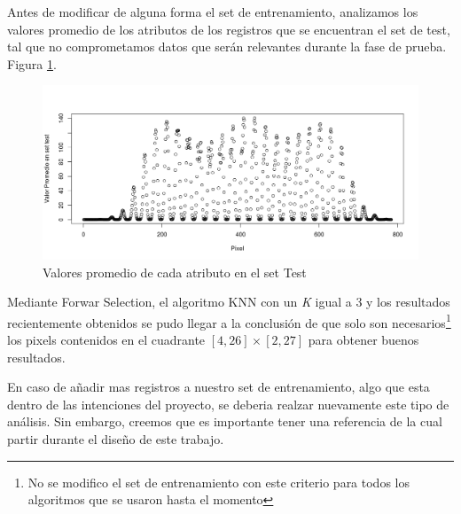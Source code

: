 Antes de modificar de alguna forma el set de entrenamiento, analizamos los valores promedio de los atributos de los registros que se encuentran el set de test, tal que no comprometamos datos que serán relevantes durante la fase de prueba. Figura \ref{plot2}.

\begin{figure}[htp]
  \begin{center}
    \includegraphics[width=15cm]{Rplot01.jpeg}
    \caption{Valores promedio de cada atributo en el set Test}
    \label{plot2}
  \end{center}
\end{figure}

Mediante Forwar Selection, el algoritmo KNN con un \textit{K} igual a 3 y los resultados recientemente obtenidos se pudo llegar a la conclusión de que solo son necesarios\footnote{No se modifico el set de entrenamiento con este criterio para todos los algoritmos que se usaron hasta el momento} los pixels contenidos en el cuadrante $ [4,26]\times[2,27] $ para obtener buenos resultados. 

En caso de añadir mas registros a nuestro set de entrenamiento, algo que esta dentro de las intenciones del proyecto, se deberia realzar nuevamente este tipo de análisis. Sin embargo, creemos que es importante tener una referencia de la cual partir durante el diseño de este trabajo.
